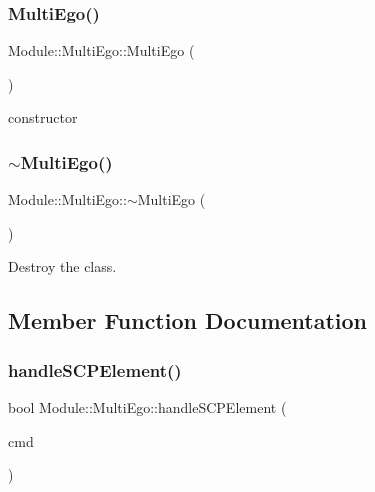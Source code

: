 \subsubsection{\texorpdfstring{Multi\+Ego()}{MultiEgo()}}
{\footnotesize\ttfamily Module\+::\+Multi\+Ego\+::\+Multi\+Ego (\begin{DoxyParamCaption}{ }\end{DoxyParamCaption})\hspace{0.3cm}{\ttfamily [explicit]}}

constructor \mbox{\label{classModule_1_1MultiEgo_a6ba87ba21b45b142b48c07cb752c9fa9}} 
\subsubsection{\texorpdfstring{$\sim$\+Multi\+Ego()}{~MultiEgo()}}
{\footnotesize\ttfamily Module\+::\+Multi\+Ego\+::$\sim$\+Multi\+Ego (\begin{DoxyParamCaption}{ }\end{DoxyParamCaption})\hspace{0.3cm}{\ttfamily [virtual]}}

Destroy the class. 

\subsection{Member Function Documentation}
\mbox{\label{classModule_1_1MultiEgo_ad2f951cc83aab77ca8993f1250eb3b69}} 
\subsubsection{\texorpdfstring{handle\+S\+C\+P\+Element()}{handleSCPElement()}}
{\footnotesize\ttfamily bool Module\+::\+Multi\+Ego\+::handle\+S\+C\+P\+Element (\begin{DoxyParamCaption}\item[{Framework\+::\+Scp\+Parser $\ast$}]{cmd }\end{DoxyParamCaption})\hspace{0.3cm}{\ttfamily [virtual]}}

